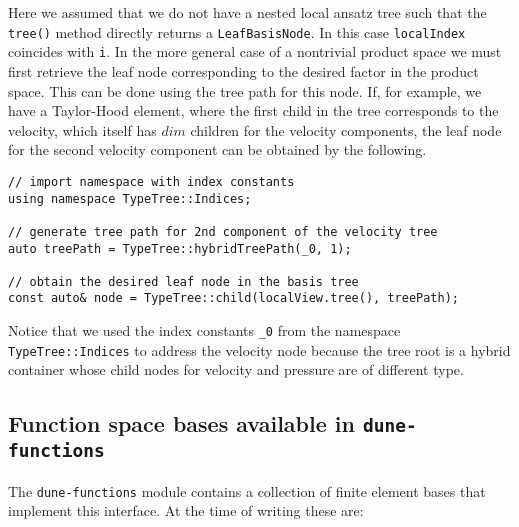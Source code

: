 \documentclass[a4paper,10pt,headings=normal,bibliography=totoc]{scrartcl}
\newcommand{\dunemodule}[1]{\texttt{#1}}
\begin{document}
Here we assumed that we do not have a nested local ansatz tree
such that the \texttt{tree()} method directly returns a \texttt{LeafBasisNode}.
In this case \texttt{localIndex} coincides with \texttt{i}.
In the more general case of a nontrivial product space
we must first retrieve the leaf node corresponding to
the desired factor in the product space. This can be done
using the tree path for this node. If, for example,
we have a Taylor-Hood element, where the first
child in the tree corresponds to the velocity,
which itself has $dim$ children for the velocity
components, the leaf node for the second velocity
component can be obtained by the following.

\begin{lstlisting}
// import namespace with index constants
using namespace TypeTree::Indices;

// generate tree path for 2nd component of the velocity tree
auto treePath = TypeTree::hybridTreePath(_0, 1);

// obtain the desired leaf node in the basis tree
const auto& node = TypeTree::child(localView.tree(), treePath);
\end{lstlisting}

Notice that we used the index constants \texttt{\_0}
from the namespace \texttt{TypeTree::Indices}
to address the velocity node because the
tree root is a hybrid container whose child nodes
for velocity and pressure are of different type.


\subsection{Function space bases available in \texorpdfstring{\dunemodule{dune-functions}}{dune-functions}}

The \dunemodule{dune-functions} module contains a collection of finite element bases that implement
this interface.  At the time of writing these are:
\end{document}
